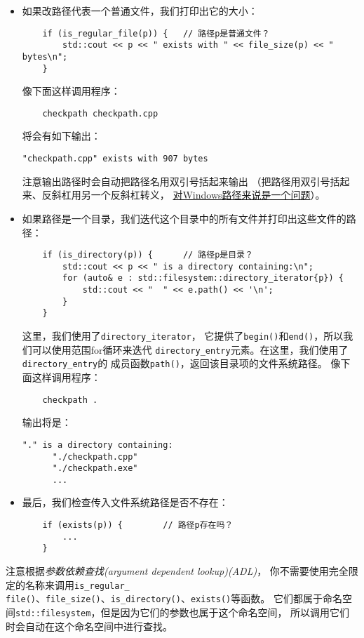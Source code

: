 \begin{itemize}
    \item 如果改路径代表一个普通文件，我们打印出它的大小：
    \begin{lstlisting}
    if (is_regular_file(p)) {   // 路径p是普通文件？
        std::cout << p << " exists with " << file_size(p) << " bytes\n";
    }
    \end{lstlisting}
    像下面这样调用程序：
    \begin{lstlisting}
    checkpath checkpath.cpp
    \end{lstlisting}
    将会有如下输出：
    \begin{lstlisting}[stringstyle=\color{black}]
    "checkpath.cpp" exists with 907 bytes
    \end{lstlisting}
    注意输出路径时会自动把路径名用双引号括起来输出
    （把路径用双引号括起来、反斜杠用另一个反斜杠转义，
    \hyperref[ch20.1.1.1]{对Windows路径来说是一个问题}）。
    \item 如果路径是一个目录，我们迭代这个目录中的所有文件并打印出这些文件的路径：
    \begin{lstlisting}
    if (is_directory(p)) {      // 路径p是目录？
        std::cout << p << " is a directory containing:\n";
        for (auto& e : std::filesystem::directory_iterator{p}) {
            std::cout << "  " << e.path() << '\n';
        }
    }
    \end{lstlisting}
    这里，我们使用了\texttt{directory\_iterator}，
    它提供了\texttt{begin()}和\texttt{end()}，所以我们可以使用范围for循环来迭代
    \texttt{directory\_entry}元素。在这里，我们使用了\texttt{directory\_entry}的
    成员函数\texttt{path()}，返回该目录项的文件系统路径。
    像下面这样调用程序：
    \begin{lstlisting}
    checkpath .
    \end{lstlisting}
    输出将是：
    \begin{lstlisting}[stringstyle=\color{black}]
    "." is a directory containing:
      "./checkpath.cpp"
      "./checkpath.exe"
      ...
    \end{lstlisting}
    \item 最后，我们检查传入文件系统路径是否不存在：
    \begin{lstlisting}
    if (exists(p)) {        // 路径p存在吗？
        ...
    }
    \end{lstlisting}
\end{itemize}
注意根据\emph{参数依赖查找(argument dependent lookup)(ADL)}，
你不需要使用完全限定的名称来调用\texttt{is\_regular\_\\
file()}、\texttt{file\_size()}、\texttt{is\_directory()}、\texttt{exists()}等函数。
它们都属于命名空间\texttt{std::filesystem}，但是因为它们的参数也属于这个命名空间，
所以调用它们时会自动在这个命名空间中进行查找。


